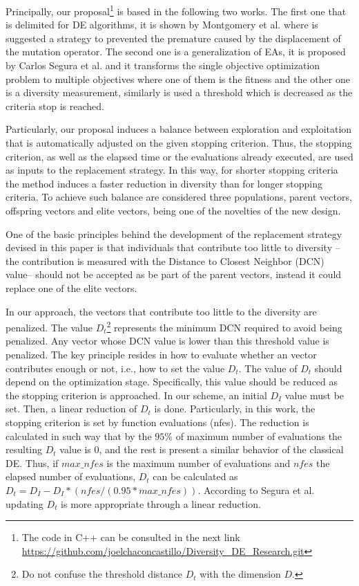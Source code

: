 Principally, our proposal\footnote{The code in C++ can be consulted in the next link \url{https://github.com/joelchaconcastillo/Diversity\_DE\_Research.git} } is  based in the following two works.
%
The first one that is delimited for DE algorithms, it is shown by Montgomery et al. \cite{montgomery2012simple} where is suggested a strategy to prevented the premature caused by the displacement of the mutation operator.
%
The second one is a generalization of EAs, it is proposed by Carlos Segura et al. \cite{segura2016novel} and it transforms the single objective optimization problem to multiple objectives where one of them is the fitness and the other one is a diversity measurement, similarly is used a threshold which is decreased as the criteria stop is reached.
%

Particularly, our proposal induces a balance between exploration and exploitation that is automatically adjusted on the given stopping criterion.
%
Thus, the stopping criterion, as well as the elapsed time or the evaluations already executed, are used as inputs to the replacement strategy.
%
In this way, for shorter stopping criteria the method induces a faster reduction in diversity than for longer stopping criteria.
%
To achieve such balance are considered three populations, parent vectors, offspring vectors and elite vectors, being one of the novelties of the new design.
%

One of the basic principles behind the development of the replacement strategy devised in this paper is that individuals that contribute too little to diversity --the contribution is measured with the Distance to Closest Neighbor (DCN) value-- should not be accepted as be part of the parent vectors, instead it could replace one of the elite vectors.
%

In our approach, the vectors that contribute too little to the diversity are penalized.
%
The value $D_t$\footnote{Do not confuse the threshold distance $D_t$ with the dimension $D$. } represents the minimum DCN required to avoid being penalized.
%
Any vector whose DCN value is lower than this threshold value is penalized.
%
The key principle resides in how to evaluate whether an vector contributes enough or not, i.e., how to set the value $D_t$.
%
The value of $D_t$ should depend on the optimization stage.
%
Specifically, this value should be reduced as the stopping criterion is approached.
%
In our scheme, an initial $D_I$ value must be set.
%
Then, a linear reduction of $D_t$ is done.
%
Particularly, in this work, the stopping criterion is set by function evaluations (nfes).
%
The reduction is calculated in such way that by the $95\%$ of maximum number of evaluations the resulting $D_t$ value is $0$, and the rest is present a similar behavior of the classical DE.
%
Thus, if $max\_nfes$ is the maximum number of evaluations and $nfes$ the elapsed number of evaluations, $D_t$ can be calculated as $D_t=D_I - D_I *(nfes/(0.95*max\_nfes))$.
%
According to Segura et al. \cite{segura2016novel} updating $D_t$ is more appropriate through a linear reduction.
%


